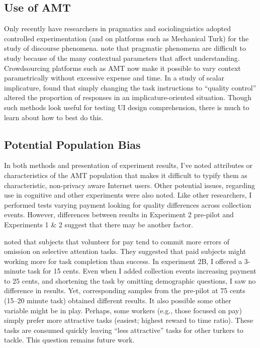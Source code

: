 \subsection{Use of AMT}
\label{useofamt}

Only recently have researchers in pragmatics and sociolinguistics adopted controlled experimentation (and on platforms such as Mechanical Turk) for the study of discourse phenomena.  \citet{Assessingthepragma:2011ug}  note that pragmatic phenomena are difficult to study because of the many contextual parameters that affect understanding. Crowdsourcing platforms such as AMT now make it possible to vary context parametrically without excessive expense and time. In a study of scalar implicature,  \citet{Assessingthepragma:2011ug}  found that simply changing the task instructions to ``quality control'' altered the proportion of responses in an implicature-oriented situation. Though such methods look useful for testing UI design comprehension, there is much to learn about how to best do this.

\subsection{Potential Population Bias}
\label{potentialpopulationbias}

In both methods and presentation of experiment results, I've noted attributes or characteristics of the AMT population that makes it difficult to typify them as characteristic, non-privacy aware Internet users. Other potential issues, regarding use in cognitive and other experiments were also noted. Like other researchers, I performed tests varying payment looking for quality differences across collection events. However, differences between results in Experiment 2 pre-pilot and Experiments 1 \& 2 suggest that there may be another factor.

 \citet{Rush:1978tw}  noted that subjects that volunteer for pay tend to commit more errors of omission on selective attention tasks. They suggested that paid subjects might working more for task completion than success. In experiment 2B, I offered a 3-minute task for 15 cents. Even when I added collection events increasing payment to 25 cents, and shortening the task by omitting demographic questions, I saw no difference in results. Yet, corresponding samples from the pre-pilot at 75 cents (15--20 minute task) obtained different results. It also possible some other variable might be in play. Perhaps, some workers (e.g., those focused on pay) simply prefer more attractive tasks (easiest; highest reward to time ratio). These tasks are consumed quickly leaving ``less attractive'' tasks for other turkers to tackle. This question remains future work.

